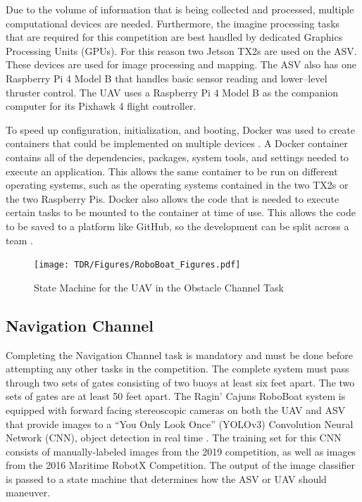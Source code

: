 \documentclass[letterpaper, 12 pt, conference]{ieeeconf}
\begin{document}
Due to the volume of information that is being collected and processed, multiple computational devices are needed. Furthermore, the imagine processing tasks that are required for this competition are best handled by dedicated Graphics Processing Units (GPUs). For this reason two Jetson TX2s are used on the ASV. These devices are used for image processing and mapping. The ASV also has one Raspberry Pi 4 Model B that handles basic sensor reading and lower--level thruster control. The UAV uses a Raspberry Pi 4 Model B as the companion computer for its Pixhawk 4 flight controller.

To speed up configuration, initialization, and booting, Docker was used to create containers that could be implemented on multiple devices \cite{merkel2014docker}. A Docker container contains all of the dependencies, packages, system tools, and settings needed to execute an application. This allows the same container to be run on different operating systems, such as the operating systems contained in the two TX2s or the two Raspberry Pis. Docker also allows the code that is needed to execute certain tasks to be mounted to the container at time of use. This allows the code to be saved to a platform like GitHub, so the development can be split across a team \cite{roboboatgit}. 
\begin{figure}[t]
\centering
\texttt{[image: TDR/Figures/RoboBoat\_Figures.pdf]}
\caption{State Machine for the UAV in the Obstacle Channel Task}
\label{fig:UAVObstacleChan}
\end{figure}
\subsection{Navigation Channel}
\label{NavigationChannel}
% 
Completing the Navigation Channel task is mandatory and must be done before attempting any other tasks in the competition. The complete system must pass through two sets of gates consisting of two buoys at least six feet apart. The two sets of gates are at least 50 feet apart. The Ragin' Cajuns RoboBoat system is equipped with forward facing stereoscopic cameras on both the UAV and ASV that provide images to a “You Only Look Once” (YOLOv3) Convolution Neural Network (CNN), object detection in real time \cite{DBLP:journals/corr/abs-1804-02767}. The training set for this CNN consists of manually-labeled images from the 2019 competition, as well as images from the 2016 Maritime RobotX Competition. The output of the image classifier is passed to a state machine that determines how the ASV or UAV should maneuver.
\end{document}
